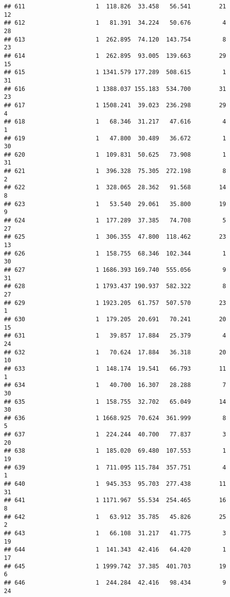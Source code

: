 \documentclass[
]{article}
\begin{document}
\begin{verbatim}
## 611                    1  118.826  33.458   56.541        21        12
## 612                    1   81.391  34.224   50.676         4        28
## 613                    1  262.895  74.120  143.754         8        23
## 614                    1  262.895  93.005  139.663        29        15
## 615                    1 1341.579 177.289  508.615         1        31
## 616                    1 1388.037 155.183  534.700        31        23
## 617                    1 1508.241  39.023  236.298        29         4
## 618                    1   68.346  31.217   47.616         4         1
## 619                    1   47.800  30.489   36.672         1        30
## 620                    1  109.831  50.625   73.908         1        31
## 621                    1  396.328  75.305  272.198         8         2
## 622                    1  328.065  28.362   91.568        14         8
## 623                    1   53.540  29.061   35.800        19         9
## 624                    1  177.289  37.385   74.708         5        27
## 625                    1  306.355  47.800  118.462        23        13
## 626                    1  158.755  68.346  102.344         1        30
## 627                    1 1686.393 169.740  555.056         9        31
## 628                    1 1793.437 190.937  582.322         8        27
## 629                    1 1923.205  61.757  507.570        23         1
## 630                    1  179.205  20.691   70.241        20        15
## 631                    1   39.857  17.884   25.379         4        24
## 632                    1   70.624  17.884   36.318        20        10
## 633                    1  148.174  19.541   66.793        11         1
## 634                    1   40.700  16.307   28.288         7        30
## 635                    1  158.755  32.702   65.049        14        30
## 636                    1 1668.925  70.624  361.999         8         5
## 637                    1  224.244  40.700   77.837         3        20
## 638                    1  185.020  69.480  107.553         1        19
## 639                    1  711.095 115.784  357.751         4         1
## 640                    1  945.353  95.703  277.438        11        31
## 641                    1 1171.967  55.534  254.465        16         8
## 642                    1   63.912  35.785   45.826        25         2
## 643                    1   66.108  31.217   41.775         3        19
## 644                    1  141.343  42.416   64.420         1        17
## 645                    1 1999.742  37.385  401.703        19         6
## 646                    1  244.284  42.416   98.434         9        24

\end{verbatim}
\end{document}
